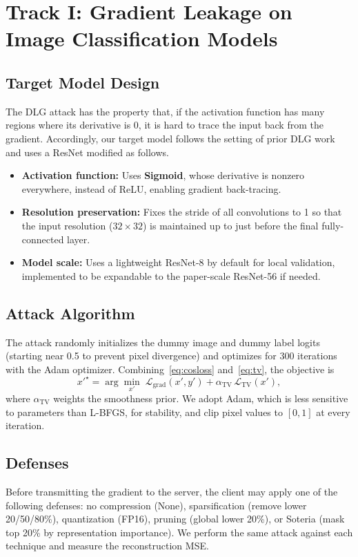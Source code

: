 \documentclass[conference]{IEEEtran}
\begin{document}
\section{Track I: Gradient Leakage on Image Classification Models}

\subsection{Target Model Design}
The DLG attack has the property that, if the activation function has many regions
where its derivative is 0, it is hard to trace the input back from the gradient.
Accordingly, our target model follows the setting of prior DLG work and uses a
ResNet modified as follows.
\begin{itemize}
\item \textbf{Activation function:} Uses \textbf{Sigmoid}, whose derivative is
nonzero everywhere, instead of ReLU, enabling gradient back-tracing.
\item \textbf{Resolution preservation:} Fixes the stride of all convolutions to
1 so that the input resolution ($32{\times}32$) is maintained up to just before
the final fully-connected layer.
\item \textbf{Model scale:} Uses a lightweight ResNet-8 by default for local
validation, implemented to be expandable to the paper-scale ResNet-56 if needed.
\end{itemize}

\subsection{Attack Algorithm}
The attack randomly initializes the dummy image and dummy label logits (starting
near 0.5 to prevent pixel divergence) and optimizes for 300 iterations with the
Adam optimizer. Combining~\eqref{eq:cosloss} and~\eqref{eq:tv}, the objective is
\begin{equation}
x'^\star=\arg\min_{x'}\;\mathcal{L}_{\mathrm{grad}}(x',y')
+\alpha_{\mathrm{TV}}\,\mathcal{L}_{\mathrm{TV}}(x') ,
\label{eq:img_obj}
\end{equation}
where $\alpha_{\mathrm{TV}}$ weights the smoothness prior. We adopt Adam, which
is less sensitive to parameters than L-BFGS, for stability, and clip pixel values
to $[0, 1]$ at every iteration.

\subsection{Defenses}
Before transmitting the gradient to the server, the client may apply one of the
following defenses: no compression (None), sparsification (remove lower
20/50/80\%), quantization (FP16), pruning (global lower 20\%), or Soteria
(mask top 20\% by representation importance). We perform the same attack against
each technique and measure the reconstruction MSE.
\end{document}
